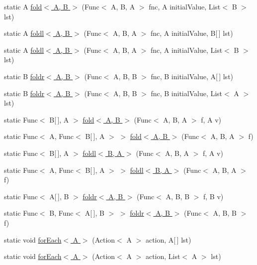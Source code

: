 \begin{DoxyCompactItemize}
\item 
static A \hyperlink{class_prelude_a5c7a2db04fffae4007e81b6b7603c45e}{fold$<$ A, B $>$} (Func$<$ A, B, A $>$ fnc, A initial\+Value, List$<$ B $>$ lst)
\item 
static A \hyperlink{class_prelude_a217b4aefb1d8ddcd878f3d6356cacb13}{foldl$<$ A, B $>$} (Func$<$ A, B, A $>$ fnc, A initial\+Value, B\mbox{[}$\,$\mbox{]} lst)
\item 
static A \hyperlink{class_prelude_a4fd483d3429e545c92514ae8e55728ca}{foldl$<$ A, B $>$} (Func$<$ A, B, A $>$ fnc, A initial\+Value, List$<$ B $>$ lst)
\item 
static B \hyperlink{class_prelude_a48f1f639f88c94888cabe71e5537088d}{foldr$<$ A, B $>$} (Func$<$ A, B, B $>$ fnc, B initial\+Value, A\mbox{[}$\,$\mbox{]} lst)
\item 
static B \hyperlink{class_prelude_a96d2955bceb349a2dcbd0883a66d64b9}{foldr$<$ A, B $>$} (Func$<$ A, B, B $>$ fnc, B initial\+Value, List$<$ A $>$ lst)
\item 
static Func$<$ B\mbox{[}$\,$\mbox{]}, A $>$ \hyperlink{class_prelude_ad6748461321296daf2464de19fed74d2}{fold$<$ A, B $>$} (Func$<$ A, B, A $>$ f, A v)
\item 
static Func$<$ A, Func$<$ B\mbox{[}$\,$\mbox{]}, A $>$ $>$ \hyperlink{class_prelude_aee6429e9c052d61efb829fc5400a235d}{fold$<$ A, B $>$} (Func$<$ A, B, A $>$ f)
\item 
static Func$<$ B\mbox{[}$\,$\mbox{]}, A $>$ \hyperlink{class_prelude_a55b78d04263ad1842e5d47f536edeca0}{foldl$<$ B, A $>$} (Func$<$ A, B, A $>$ f, A v)
\item 
static Func$<$ A, Func$<$ B\mbox{[}$\,$\mbox{]}, A $>$ $>$ \hyperlink{class_prelude_adbeb5c8468b2aeb0e79ddb072d0023df}{foldl$<$ B, A $>$} (Func$<$ A, B, A $>$ f)
\item 
static Func$<$ A\mbox{[}$\,$\mbox{]}, B $>$ \hyperlink{class_prelude_a32fff507757a2de2fc80ab301d1a796e}{foldr$<$ A, B $>$} (Func$<$ A, B, B $>$ f, B v)
\item 
static Func$<$ B, Func$<$ A\mbox{[}$\,$\mbox{]}, B $>$ $>$ \hyperlink{class_prelude_ac7e2dc58f595d4d4ae535ca42e74e3c2}{foldr$<$ A, B $>$} (Func$<$ A, B, B $>$ f)
\item 
static void \hyperlink{class_prelude_adb9a56a00f809723b2ddbef11f7c97a0}{for\+Each$<$ A $>$} (Action$<$ A $>$ action, A\mbox{[}$\,$\mbox{]} lst)
\item 
static void \hyperlink{class_prelude_ad0669a4d7c08cf48ccad7d5084428cb9}{for\+Each$<$ A $>$} (Action$<$ A $>$ action, List$<$ A $>$ lst)

\end{DoxyCompactItemize}
